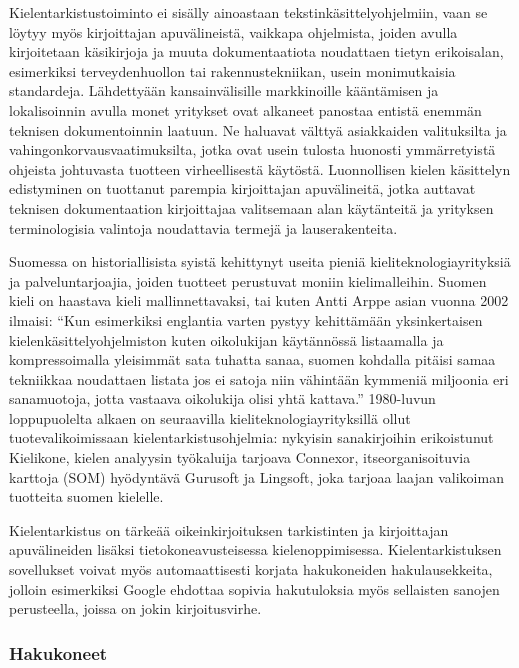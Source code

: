 \begin{multicols}{2}
Kielentarkistustoiminto ei sisälly ainoastaan tekstinkäsittelyohjelmiin, vaan se löytyy myös kirjoittajan apuvälineistä, vaikkapa ohjelmista, joiden avulla kirjoitetaan käsikirjoja ja muuta dokumentaatiota noudattaen tietyn erikoisalan, esimerkiksi terveydenhuollon tai rakennustekniikan, usein monimutkaisia standardeja. Lähdettyään kansainvälisille markkinoille kääntämisen ja lokalisoinnin avulla monet yritykset ovat alkaneet panostaa entistä enemmän teknisen dokumentoinnin laatuun. Ne haluavat välttyä asiakkaiden valituksilta ja vahingonkorvausvaatimuksilta, jotka ovat usein tulosta huonosti ymmärretyistä ohjeista johtuvasta tuotteen virheellisestä käytöstä. Luonnollisen kielen käsittelyn edistyminen on tuottanut parempia kirjoittajan apuvälineitä, jotka auttavat teknisen dokumentaation kirjoittajaa valitsemaan alan käytänteitä ja yrityksen terminologisia valintoja noudattavia termejä ja lauserakenteita.  

Suomessa on historiallisista syistä kehittynyt useita pieniä kieliteknologiayrityksiä ja palveluntarjoajia, joiden tuotteet perustuvat moniin kielimalleihin. Suomen kieli on haastava kieli mallinnettavaksi, tai kuten Antti Arppe asian vuonna 2002 ilmaisi: ``Kun esimerkiksi englantia varten pystyy kehittämään yksinkertaisen kielenkäsittelyohjelmiston kuten oikolukijan käytännössä listaamalla ja kompressoimalla yleisimmät sata tuhatta sanaa, suomen kohdalla pitäisi samaa tekniikkaa noudattaen listata jos ei satoja niin vähintään kymmeniä miljoonia eri sanamuotoja, jotta vastaava oikolukija olisi yhtä kattava.'' \cite{EiPolkua} 1980-luvun loppupuolelta alkaen on seuraavilla kieliteknologiayrityksillä ollut tuotevalikoimissaan kielentarkistusohjelmia: nykyisin sanakirjoihin erikoistunut Kielikone, kielen analyysin työkaluija tarjoava Connexor, itseorganisoituvia karttoja (SOM) hyödyntävä Gurusoft ja Lingsoft, joka tarjoaa laajan valikoiman tuotteita suomen kielelle.

Kielentarkistus on tärkeää oikeinkirjoituksen tarkistinten ja kirjoittajan apuvälineiden lisäksi tietokoneavusteisessa kielenoppimisessa.  Kielentarkistuksen sovellukset voivat myös automaattisesti korjata hakukoneiden hakulausekkeita, jolloin esimerkiksi Google ehdottaa sopivia hakutuloksia myös sellaisten sanojen perusteella, joissa on jokin kirjoitusvirhe.

\subsubsection{Hakukoneet}


\end{multicols}

